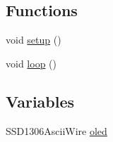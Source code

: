 \subsection*{Functions}
\begin{DoxyCompactItemize}
\item 
void \hyperlink{Blattdurchmesser_8ino_a4fc01d736fe50cf5b977f755b675f11d}{setup} ()
\item 
void \hyperlink{Blattdurchmesser_8ino_afe461d27b9c48d5921c00d521181f12f}{loop} ()
\end{DoxyCompactItemize}
\subsection*{Variables}
\begin{DoxyCompactItemize}
\item 
S\-S\-D1306\-Ascii\-Wire \hyperlink{Blattdurchmesser_8ino_ad5f8b489b649f5974de70af2a799aee4}{oled}
\end{DoxyCompactItemize}


